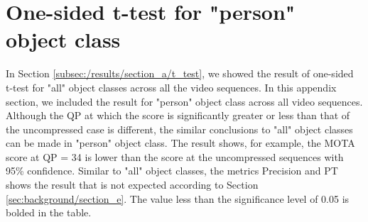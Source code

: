 \section{One-sided t-test for "person" object class}
\label{sec:appendix/section_t_test_0}

In Section \ref{subsec:/results/section_a/t_test}, we showed the result of one-sided t-test for "all" object classes across all the video sequences. In this appendix section, we included the result for "person" object class across all video sequences. Although the QP at which the score is significantly greater or less than that of the uncompressed case is different, the similar conclusions to "all" object classes can be made in "person" object class. The result shows, for example, the MOTA score at QP = 34 is lower than the score at the uncompressed sequences with 95\% confidence. Similar to "all" object classes, the metrics Precision and PT shows the result that is not expected according to Section \ref{sec:background/section_e}. The value less than the significance level of 0.05 is bolded in the table.
